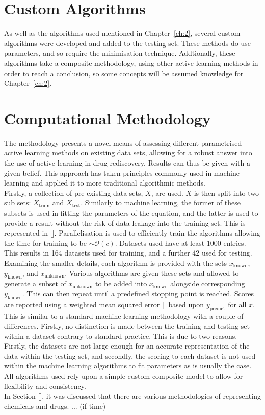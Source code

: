 \section{Custom Algorithms}
As well as the algorithms used mentioned in Chapter~\ref{ch:2}, several custom algorithms were developed and added to the testing set. These methods do use parameters, and so require the minimisation technique. Addtionally, these algorithms take a composite methodology, using other active learning methods in order to reach a conclusion, so some concepts will be assumed knowledge for Chapter~\ref{ch:2}.

\section{Computational Methodology}
The methodology presents a novel means of assessing different parametrised active learning methods on existing data sets, allowing for a robust answer into the use of active learning in drug rediscovery. Results can thus be given with a given belief. This approach has taken principles commonly used in machine learning and applied it to more traditional algorithmic methods.
\\
Firstly, a collection of pre-existing data sets, $X$, are used. $X$ is then split into two sub sets: $X_{\mathrm{train}}$ and $X_\mathrm{test}$. Similarly to machine learning, the former of these subsets is used in fitting the parameters of the equation, and the latter is used to provide a result without the risk of data leakage into the training set. This is represented in []. Parallelisation is used to efficiently train the algorithms allowing the time for training to be $\sim{}\mathcal{O}(c)$. Datasets used have at least 1000 entries. This results in 164 datasets used for training, and a further 42 used for testing.
\\
Examining the smaller details, each algorithm is provided with the sets $x_\mathrm{known}$, $y_\mathrm{known}$, and $x_\mathrm{unknown}$. Various algorithms are given these sets and allowed to generate a subset of $x_\mathrm{unknown}$ to be added into $x_\mathrm{known}$ alongside corresponding $y_\mathrm{known}$. This can then repeat until a predefined stopping point is reached. Scores are reported using a weighted mean squared error [] based upon $y_\mathrm{predict}$ for all $x$. This is similar to a standard machine learning methodology with a couple of differences. Firstly, no distinction is made between the training and testing set within a dataset contrary to standard practice. This is due to two reasons. Firstly, the datasets are not large enough for an accurate representation of the data within the testing set, and secondly, the scoring to each dataset is not used within the machine learning algorithms to fit parameters as is usually the case. All algorithms used rely upon a simple custom composite model to allow for flexibility and consistency.
\\
In Section [], it was discussed that there are various methodologies of representing chemicals and drugs. ... (if time)


